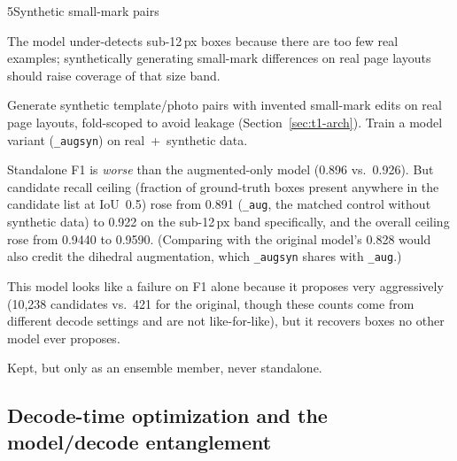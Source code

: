 \begin{explog}{5}{Synthetic small-mark pairs}
\item[Hypothesis] The model under-detects sub-12\,px boxes because there are too few real examples; synthetically generating small-mark differences on real page layouts should raise coverage of that size band.
\item[Method] Generate synthetic template/photo pairs with invented small-mark edits on real page layouts, fold-scoped to avoid leakage (Section~\ref{sec:t1-arch}). Train a model variant (\texttt{\_augsyn}) on real~+~synthetic data.
\item[Result] Standalone F1 is \emph{worse} than the augmented-only model (0.896 vs.\ 0.926). But candidate recall ceiling (fraction of ground-truth boxes present anywhere in the candidate list at IoU~0.5) rose from 0.891 (\texttt{\_aug}, the matched control without synthetic data) to 0.922 on the sub-12\,px band specifically, and the overall ceiling rose from 0.9440 to 0.9590. (Comparing with the original model's 0.828 would also credit the dihedral augmentation, which \texttt{\_augsyn} shares with \texttt{\_aug}.)
\item[Inference] This model looks like a failure on F1 alone because it proposes very aggressively (10{,}238 candidates vs.\ 421 for the original, though these counts come from different decode settings and are not like-for-like), but it recovers boxes no other model ever proposes.
\item[Verdict] Kept, but only as an ensemble member, never standalone.
\end{explog}


\subsection{Decode-time optimization and the model/decode entanglement}

